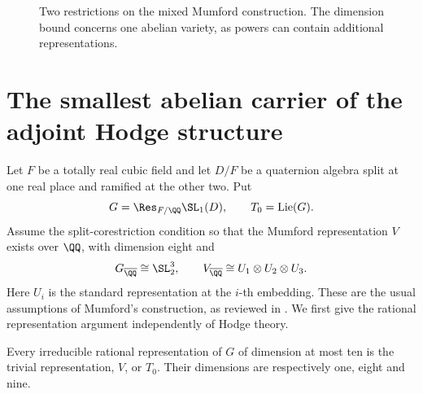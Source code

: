 \begin{figure}[tb]
\centering
{}
\caption{Two restrictions on the mixed Mumford construction. The dimension bound concerns one abelian variety, as powers can contain additional representations.}
\label{round26:fig:hodge-carriers}
\end{figure}

\section{The smallest abelian carrier of the adjoint Hodge structure}

Let $F$ be a totally real cubic field and let $D/F$ be a quaternion
algebra split at one real place and ramified at the other two. Put
\[
 G=\Res_{F/\QQ}\SL_1(D),\qquad T_0=\Lie(G).
\]
Assume the split-corestriction condition so that the Mumford
representation $V$ exists over $\QQ$, with dimension eight and
\[
 G_{\overline\QQ}\cong\SL_2^3,\qquad
 V_{\overline\QQ}\cong U_1\otimes U_2\otimes U_3.
\]
Here $U_i$ is the standard representation at the $i$-th embedding.
These are the usual assumptions of Mumford's construction, as
reviewed in \cite{Galluzzi00}. We first give the rational
representation argument independently of Hodge theory.

\begin{lemma}\label{round26:carrier:small-representations}
Every irreducible rational representation of $G$ of dimension at
most ten is the trivial representation, $V$, or $T_0$.
Their dimensions are respectively one, eight and nine.
\end{lemma}

